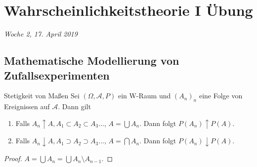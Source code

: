 \documentclass[a4paper, landscape,twocolumn,fontsize=9pt]{scrartcl}
\begin{document}
\section{Wahrscheinlichkeitstheorie I Übung}
\textit{Woche 2, 17. April 2019}

\subsection{Mathematische Modellierung von Zufallsexperimenten}

\begin{theorem}{Stetigkeit von Maßen}{}
Sei $(\Omega, \mathcal A, P)$ ein W-Raum und $(A_n)_n$ eine Folge von Ereignissen auf $\mathcal A$. Dann gilt
\begin{enumerate}
\item Falls $A_n \uparrow A, A_1 \subset A_2 \subset A_3 ...$, $A = \bigcup A_n$. Dann folgt $P(A_n) \uparrow P(A)$.

\item Falls $A_n \downarrow A, A_1 \supset A_2 \supset A_3 ...$, $A = \bigcap A_n$. Dann folgt $P(A_n) \downarrow P(A)$.
\end{enumerate}
\end{theorem}

\begin{proof}
$A = \bigcup A_n  = \bigcup A_n \setminus A_{n-1}$. 
\end{proof}
\end{document}
